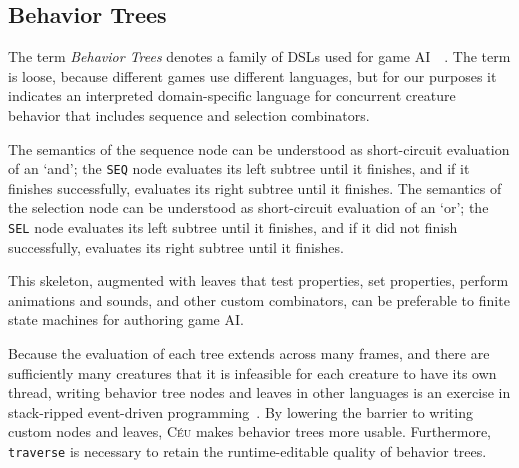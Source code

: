 \documentclass{sig-alternate}
\newcommand{\CEU}{\textsc{C\'{e}u}\xspace}
\newcommand{\code}[1] {{\small{\texttt{#1}}}}
\begin{document}

\subsection{Behavior Trees}

The term \emph{Behavior Trees} denotes a family of DSLs used for game 
AI~\cite{isla2005}~\cite{hecker2009my}.
The term is loose, because different games use different languages,
but for our purposes it indicates an interpreted domain-specific language
for concurrent creature behavior that includes sequence and selection combinators.

The semantics of the sequence node can be understood as short-circuit evaluation of an `and';
the \code{SEQ} node evaluates its left subtree until it finishes,
and if it finishes successfully, evaluates its right subtree until it finishes.
The semantics of the selection node can be understood as short-circuit evaluation of an `or';
the \code{SEL} node evaluates its left subtree until it finishes,
and if it did not finish successfully, evaluates its right subtree until it finishes.

This skeleton, augmented with leaves that test properties, set properties, perform animations and sounds,
and other custom combinators, can be preferable to finite state machines for authoring game AI.

Because the evaluation of each tree extends across many frames,
and there are sufficiently many creatures that it is infeasible for each creature to have its own thread,
writing behavior tree nodes and leaves in other languages is an exercise in stack-ripped event-driven programming~\cite{krohn2007events}.
By lowering the barrier to writing custom nodes and leaves, \CEU makes behavior trees more usable.
Furthermore, \code{traverse} is necessary to retain the runtime-editable quality of behavior trees.
\end{document}
